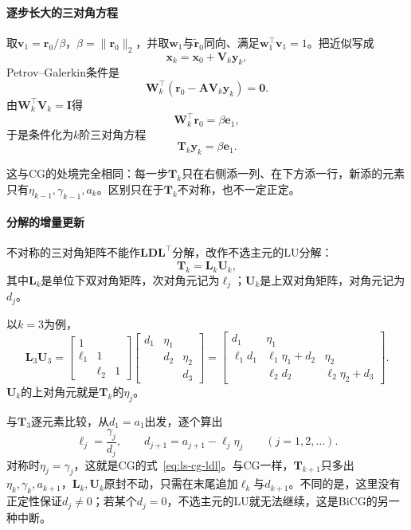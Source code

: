 \paragraph{逐步长大的三对角方程}
取$\bm v_1=\bm r_0/\beta$，$\beta=\lVert\bm r_0\rVert_2$，并取$\bm w_1$与$\widetilde{\bm r}_0$同向、满足$\bm w_1^\top\bm v_1=1$。把近似写成
\[
  \bm x_k=\bm x_0+\bm V_k\bm y_k ,
\]
Petrov--Galerkin条件是
\[
  \bm W_k^\top(\bm r_0-\bm A\bm V_k\bm y_k)=\bm 0 .
\]
由$\bm W_k^\top\bm V_k=\bm I$得
\[
  \bm W_k^\top\bm r_0=\beta\bm e_1 ,
\]
于是条件化为$k$阶三对角方程
\begin{equation}
 \bm T_k\bm y_k=\beta\bm e_1 .
 \label{eq:ls-bicg-tridiagonal-system}
\end{equation}

这与CG的处境完全相同：每一步$\bm T_k$只在右侧添一列、在下方添一行，新添的元素只有$\eta_{k-1},\gamma_{k-1},a_k$。区别只在于$\bm T_k$不对称，也不一定正定。

\paragraph{分解的增量更新}
不对称的三对角矩阵不能作$\bm L\bm D\bm L^\top$分解，改作不选主元的LU分解：
\[
 \bm T_k=\bm L_k\bm U_k ,
\]
其中$\bm L_k$是单位下双对角矩阵，次对角元记为$\ell_j$；$\bm U_k$是上双对角矩阵，对角元记为$d_j$。

以$k=3$为例，
\[
 \bm L_3\bm U_3=
 \begin{bmatrix}1&&\\\ell_1&1&\\&\ell_2&1\end{bmatrix}
 \begin{bmatrix}d_1&\eta_1&\\&d_2&\eta_2\\&&d_3\end{bmatrix}
 =\begin{bmatrix}d_1&\eta_1&\\\ell_1d_1&\ell_1\eta_1+d_2&\eta_2\\&\ell_2d_2&\ell_2\eta_2+d_3\end{bmatrix}.
\]
$\bm U_k$的上对角元就是$\bm T_k$的$\eta_j$。

与$\bm T_3$逐元素比较，从$d_1=a_1$出发，逐个算出
\begin{equation}
 \ell_j=\frac{\gamma_j}{d_j},\qquad d_{j+1}=a_{j+1}-\ell_j\eta_j\qquad(j=1,2,\ldots).
 \label{eq:ls-bicg-lu}
\end{equation}
对称时$\eta_j=\gamma_j$，这就是CG的式~\eqref{eq:ls-cg-ldl}。与CG一样，$\bm T_{k+1}$只多出$\eta_k,\gamma_k,a_{k+1}$，$\bm L_k,\bm U_k$原封不动，只需在末尾追加$\ell_k$与$d_{k+1}$。不同的是，这里没有正定性保证$d_j\ne0$；若某个$d_j=0$，不选主元的LU就无法继续，这是BiCG的另一种中断。

